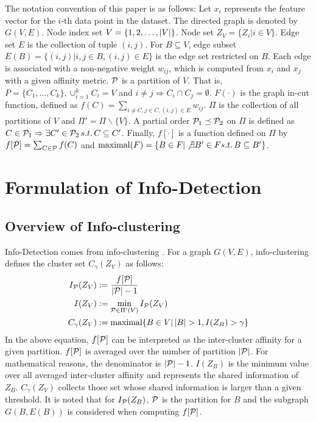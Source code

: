 \documentclass[runningheads]{llncs}
\begin{document}
The notation convention of this paper is as follows: Let $x_i$ represents the feature vector for the $i$-th data point in the dataset. The directed graph is denoted by $G(V, E)$. Node index set $V=\{1, 2,\dots, \abs{V}\}$. Node set $Z_V=\{Z_i | i \in V\}$. Edge set $E$ is the collection of tuple $(i,j)$. For $B\subseteq V$, edge subset $E(B) = \{(i,j)| i, j \in B,(i,j)\in E\}$ is the edge set restricted on $B$. Each edge is associated with a non-negative weight $w_{ij}$, which is computed from $x_i$ and $x_j$ with a given affinity metric. $\P$ is a partition of $V$. That is, $P=\{C_1, \dots, C_k\}, \cup_{i=1}^k C_i=V$ and $i\neq j \Rightarrow C_i \cap C_j =\emptyset $. $F(\cdot)$ is the graph in-cut function, defined as $f(C)=\sum_{i \neq C, j\in C, (i,j) \in E} w_{ij}$. $\Pi$ is the collection of all partitions of $V$ and $\Pi'=\Pi\backslash\{V\}$. A partial order $ \P_1 \preceq \P_2$ on $\Pi$ is defined as
$C \in \P_1 \Rightarrow \exists C' \in \P_2 \, s.t. \, C \subseteq C'$.
Finally, $f[\cdot]$ is a function defined on $\Pi$ by $f[\P]=\sum_{C\in \P}f(C)$ and $\textrm{maximal} (F)=\{B\in F | \not\exists B' \in F s.t.\, B \subseteq B'\}$.

\section{Formulation of Info-Detection}\label{sec:ID}
\subsection{Overview of Info-clustering}
Info-Detection comes from info-clustering \cite{RN1}. For a graph $G(V,E)$, info-clustering defines the cluster set $C_{\gamma}(Z_V)$ as follows:
\begin{align}
I_{\P}(Z_V) & := \frac{ f[\P] }{  \abs{\mathcal{P}} - 1 } \label{eq:IP}\\
I(Z_V) & := \min_{\mathcal{P} \in \Pi'(V)} I_{\mathcal{P}}(Z_V)  \label{eq:ms} \\
C_{\gamma}(Z_V) & := \textrm{maximal}\{ B \in V \vert \, \abs{B} > 1, I(Z_B) > \gamma \} \label{eq:CgZv}
\end{align}
In the above equation, $f[\P]$ can be interpreted as the inter-cluster affinity for a given partition. $f[\P]$ is averaged over the number of partition $\abs{\P}$. For mathematical reasons, the denominator is $\abs{\P}-1$. $I(Z_B)$ is the minimum value over all averaged inter-cluster affinity and represents the shared information of $Z_B$. $C_{\gamma}(Z_V)$ collects those set whose shared information is larger than a given threshold. It is noted that for $I_{\P}(Z_B)$, $\P$ is the partition for $B$ and the subgraph $G(B,E(B))$ is considered when computing $f[\P]$.
\end{document}
